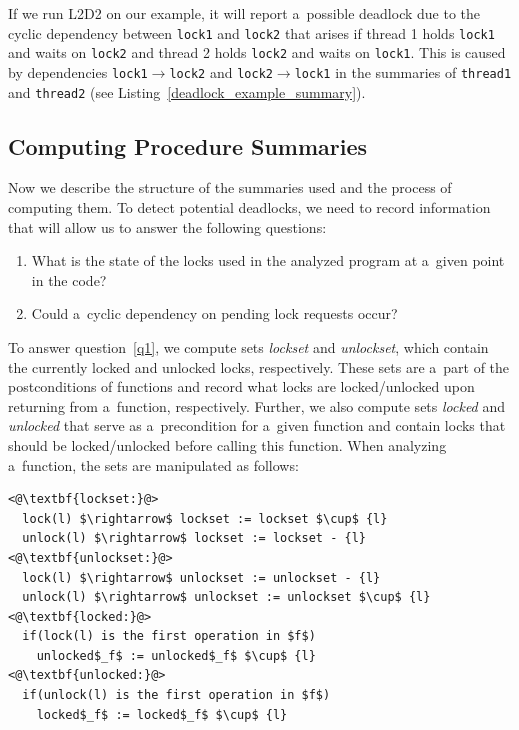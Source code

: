 \documentclass{ExcelAtFIT}
\begin{document}
If we run L2D2 on our example, it will report a~possible deadlock due to the cyclic dependency between \texttt{lock1} and \texttt{lock2} that arises if thread 1 holds \texttt{lock1} and waits on \texttt{lock2} and thread 2 holds \texttt{lock2} and waits on \texttt{lock1}. This is caused by dependencies \texttt{lock1$\rightarrow$lock2} and \texttt{lock2$\rightarrow$lock1} in the summaries of \texttt{thread1} and \texttt{thread2} 
(see Listing~\ref{deadlock_example_summary}).

\subsection{Computing Procedure Summaries}
\label{summ_computation}
Now we describe the structure of the summaries used and the process of computing them. To detect potential deadlocks, we need to record information that will allow us to answer the following questions:
\begin{enumerate}[label={(\arabic*)}, topsep=0.4em]
    \item \label{q1} What is the state of the locks used in the analyzed program at a~given point in the code?
    \item \label{q2} Could a~cyclic dependency on pending lock requests occur?
\end{enumerate}

To answer question~\ref{q1}, we compute sets \textit{lockset} and \textit{unlockset}, which contain the currently locked and unlocked locks, respectively. These sets are a~part of the postconditions of functions and record what locks are locked/unlocked upon returning from a~function, respectively. Further, we also compute sets \textit{locked} and \textit{unlocked} that serve as a~precondition for a~given function and contain locks that should be locked/unlocked before calling this function.
When analyzing a~function, the sets are manipulated as follows:
\begin{lstlisting}[mathescape=true, keywordstyle=\ttfamily]
<@\textbf{lockset:}@>
  lock(l) $\rightarrow$ lockset := lockset $\cup$ {l}
  unlock(l) $\rightarrow$ lockset := lockset - {l}
<@\textbf{unlockset:}@>
  lock(l) $\rightarrow$ unlockset := unlockset - {l}
  unlock(l) $\rightarrow$ unlockset := unlockset $\cup$ {l}
<@\textbf{locked:}@>
  if(lock(l) is the first operation in $f$)
    unlocked$_f$ := unlocked$_f$ $\cup$ {l}
<@\textbf{unlocked:}@>
  if(unlock(l) is the first operation in $f$)
    locked$_f$ := locked$_f$ $\cup$ {l}
\end{lstlisting}
\end{document}
